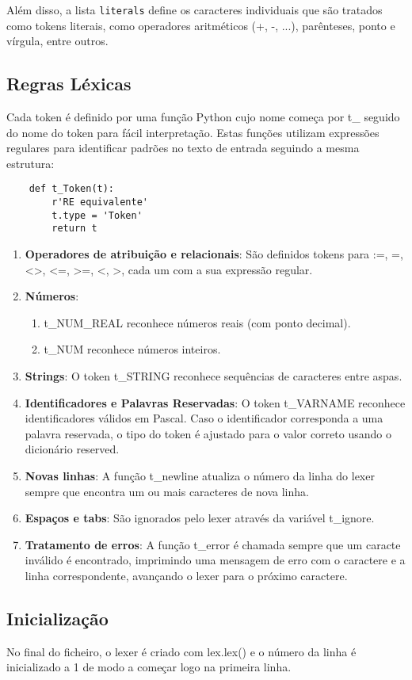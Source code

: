 Além disso, a lista \texttt{literals} define os caracteres individuais que são tratados como tokens literais, como operadores aritméticos (+, -, ...), parênteses, ponto e vírgula, entre outros.

\subsection{Regras Léxicas}

Cada token é definido por uma função Python cujo nome começa por t\_ seguido do nome do token para fácil interpretação. Estas funções utilizam expressões regulares para identificar padrões no texto de entrada seguindo a mesma estrutura:

\begin{verbatim}
    def t_Token(t):
        r'RE equivalente'
        t.type = 'Token'
        return t
\end{verbatim}

\begin{enumerate}
    \item \textbf{Operadores de atribuição e relacionais}: São definidos tokens para :=, =, <>, <=, >=, <, >, cada um com a sua expressão regular.

    \item \textbf{Números}:\begin{enumerate}
        \item t\_NUM\_REAL reconhece números reais (com ponto decimal).
        \item t\_NUM reconhece números inteiros.
    \end{enumerate}

    \item \textbf{Strings}: O token t\_STRING reconhece sequências de caracteres entre aspas.
    
    \item \textbf{Identificadores e Palavras Reservadas}: O token t\_VARNAME reconhece identificadores válidos em Pascal. Caso o identificador corresponda a uma palavra reservada, o tipo do token é ajustado para o valor correto usando o dicionário reserved.
    
    \item \textbf{Novas linhas}: A função t\_newline atualiza o número da linha do lexer sempre que encontra um ou mais caracteres de nova linha.
    
    \item \textbf{Espaços e tabs}: São ignorados pelo lexer através da variável t\_ignore.
    
    \item \textbf{Tratamento de erros}: A função t\_error é chamada sempre que um caracte inválido é encontrado, imprimindo uma mensagem de erro com o caractere e a linha correspondente, avançando o lexer para o próximo caractere.
\end{enumerate}

\subsection{Inicialização}

No final do ficheiro, o lexer é criado com lex.lex() e o número da linha é inicializado a 1 de modo a começar logo na primeira linha.

